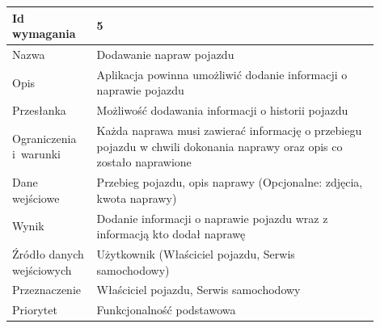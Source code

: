 \documentclass[12pt]{article}
\begin{document}
\begin{table}[H]
\begin{center}
	\begin{tabular}{|p{0.18\linewidth}|p{0.72\linewidth}|}%
	\hline
	Id wymagania 	& 5				\\ \hline
	Nazwa			& Dodawanie napraw pojazdu \\ \hline
	Opis & Aplikacja powinna umożliwić dodanie informacji o naprawie pojazdu
\\ \hline
	Przesłanka & 
Możliwość dodawania informacji o historii pojazdu
  \\ \hline
	Ograniczenia i~warunki & 
Każda naprawa musi zawierać informację o przebiegu pojazdu w chwili dokonania naprawy oraz opis co zostało naprawione
 \\ \hline
	Dane wejściowe &

Przebieg pojazdu, opis naprawy
(Opcjonalne: zdjęcia, kwota naprawy)
 \\ \hline
	Wynik & Dodanie informacji o naprawie pojazdu wraz z informacją kto dodał naprawę\\ \hline
	Źródło danych wejściowych & Użytkownik (Właściciel pojazdu, Serwis samochodowy)\\ \hline
	Przeznaczenie & Właściciel pojazdu, Serwis samochodowy\\ \hline
	Priorytet & Funkcjonalność podstawowa \\ \hline
	\end{tabular}

\end{center}
\end{table}
\end{document}
